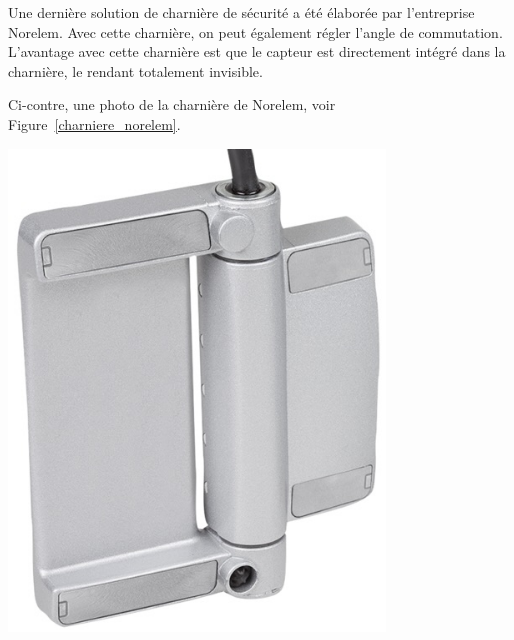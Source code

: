 \begin{minipage}[c]{0.6\textwidth}
    Une dernière solution de charnière de sécurité a été élaborée par l'entreprise Norelem. Avec cette charnière, on peut également régler l'angle de commutation. L'avantage avec cette charnière est que le capteur est directement intégré dans la charnière, le rendant totalement invisible.

    Ci-contre, une photo de la charnière de Norelem, voir Figure~\ref{charniere_norelem}.
\end{minipage}\hfill
\begin{minipage}[c]{0.35\textwidth}
    \begin{center}
        \includegraphics[width=0.75\textwidth]{assets/figures/Protections_laser/charniere_norelem.jpeg}
    \end{center}
    \label{charniere_norelem}
\end{minipage}

